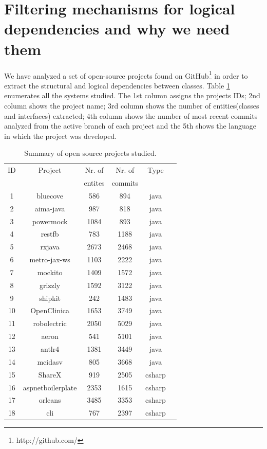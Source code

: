 \documentclass[conference]{IEEEtran}
\begin{document}
\section{Filtering mechanisms for logical dependencies and why we need them}
\label{sec:results}


We have analyzed a set of open-source projects found on GitHub\footnote{http://github.com/} \cite{Kalliamvakou2016} in order to extract the structural and logical dependencies between classes. Table \ref{table:1} enumerates all the systems studied. The 1st column assigns the projects IDs; 2nd column shows the project name; 3rd column shows the number of entities(classes and interfaces) extracted; 4th column shows the number of most recent commits analyzed from the active branch of each project and the 5th shows the language in which the project was developed.
\begin{table}[!h]
\caption{Summary of open source projects studied.}
\label{table:1}
\centering
\begin{tabular}{|c|c|c|c|c|c|}
\hline
   ID  & Project    & Nr. of & Nr. of& Type\\
     &     & entites & commits & \\
\hline
1	&	bluecove	&	586	&	894	&	java	\\
2	&	aima-java	&	987	&	818	&	java	\\
3	&	powermock	&	1084	&	893	&	java	\\
4	&	restfb	&	783	&	1188	&	java	\\
5	&	rxjava	&	2673	&	2468	&	java	\\
6	&	metro-jax-ws	&	1103	&	2222	&	java	\\
7	&	mockito	&	1409	&	1572	&	java	\\
8	&	grizzly	&	1592	&	3122	&	java	\\
9	&	shipkit	&	242	&	1483	&	java	\\
10	&	OpenClinica	&	1653	&	3749	&	java	\\
11	&	robolectric	&	2050	&	5029	&	java	\\
12	&	aeron	&	541	&	5101	&	java	\\
13	&	antlr4	&	1381	&	3449	&	java	\\
14	&	mcidasv	&	805	&	3668	&	java	\\
15	&	ShareX	&	919	&	2505	&	csharp	\\
16	&	aspnetboilerplate	&	2353	&	1615	&	csharp	\\
17	&	orleans	&	3485	&	3353	&	csharp	\\
18	&	cli	&	767	&	2397	&	csharp	\\

\end{tabular}
\end{table}
\end{document}
